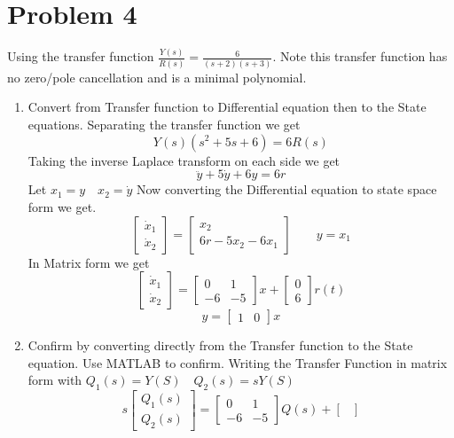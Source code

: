 \documentclass{article}
\begin{document}
\newpage
\section*{Problem 4}
Using the transfer function $\frac{Y(s)}{R(s)} = \frac{6}{(s+2)(s+3)}$.
\newline
Note this transfer function has no zero/pole cancellation and is a minimal polynomial.
\begin{enumerate}[1)]
\item Convert from Transfer function to Differential equation then to the State equations.
\newline
Separating the transfer function we get
$$ Y(s)(s^2+5s+6) = 6R(s) $$
Taking the inverse Laplace transform on each side we get
$$\ddot{y} + 5 \dot{y} + 6y = 6r $$
Let $x_1 = y \quad x_2 = \dot{y}$
Now converting the Differential equation to state space form we get.
$$
\begin{bmatrix}
\dot{x}_1 \\
\dot{x}_2
\end{bmatrix}
=
\begin{bmatrix}
x_2 \\
6 r -5x_2 -6x_1
\end{bmatrix}
\qquad
y = x_1
$$
In Matrix form we get
$$
\begin{bmatrix}
\dot{x}_1 \\
\dot{x}_2
\end{bmatrix}
=
\begin{bmatrix}
0 & 1 \\
-6 & -5 
\end{bmatrix}
x +
\begin{bmatrix}
0 \\
6
\end{bmatrix}
r(t)
$$
$$
y = \begin{bmatrix} 1 & 0 \end{bmatrix} x
$$
\item Confirm by converting directly from the Transfer function to the State equation.
{\color{blue} Use MATLAB to confirm.}
\newline
Writing the Transfer Function in matrix form with $Q_1(s) = Y(S) \quad Q_2(s) = sY(S)$
$$
s
\begin{bmatrix}
Q_1(s) \\
Q_2(s)
\end{bmatrix}
=
\begin{bmatrix}
0 & 1 \\
-6 & -5
\end{bmatrix}
Q(s)
+
\begin{bmatrix}

\end{bmatrix}$$
\end{enumerate}
\end{document}
